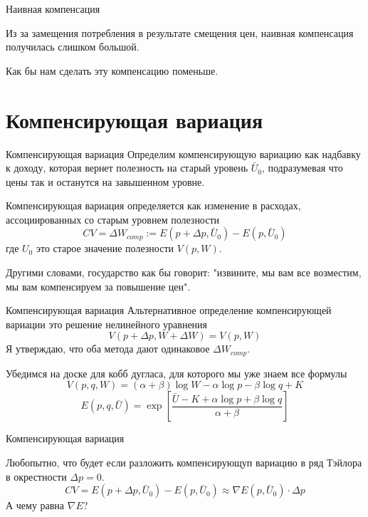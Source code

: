 \documentclass{beamer}
\begin{document}
\begin{frame}{Наивная компенсация}

Из за замещения потребления в результате смещения цен, наивная компенсация получилась слишком большой.

Как бы нам сделать эту компенсацию поменьше.

\end{frame}

\section{Компенсирующая вариация}

\begin{frame}{Компенсирующая вариация}
Определим компенсирующую вариацию как надбавку к доходу, которая вернет полезность на старый уровень $\bar U_0$, подразумевая что цены так и останутся на завышенном уровне.

\begin{definition} \alert{Компенсирующая вариация} определяется как изменение в расходах, ассоциированных со старым уровнем полезности
$$CV = \Delta W_{comp} := E(p+ \Delta p,\bar U_0) - E(p,\bar U_0)$$
где $U_0$ это старое значение полезности $V(p, W)$.
\end{definition}

Другими словами, государство как бы говорит: "извините, мы вам все возместим, мы вам \alert{компенсируем} за повышение цен".

\end{frame}

\begin{frame}{Компенсирующая вариация}
Альтернативное определение компенсирующей вариации это решение нелинейного уравнения 
$$ V(p+\Delta p,W + \Delta W) = V(p, W)$$
Я утверждаю, что оба метода дают одинаковое $\Delta W_{comp}$. 

Убедимся на доске для кобб дугласа, для которого мы уже знаем все формулы
$$ V(p,q,W) = (\alpha + \beta) \log W - \alpha \log p - \beta \log q + K$$
$$ E(p,q,\bar U) = \exp[\frac{\bar U - K + \alpha \log p + \beta \log q}{\alpha + \beta}]$$

\end{frame}

\begin{frame}{Компенсирующая вариация}

Любопытно, что будет если разложить компенсирующуп вариацию в ряд Тэйлора в окрестности $\Delta p =0$.
$$CV = E(p+ \Delta p,\bar U_0) - E(p,\bar U_0) \approx \nabla E(p,\bar U_0) \cdot \Delta p$$
А чему равна $\nabla E$?

\end{frame}
\end{document}

